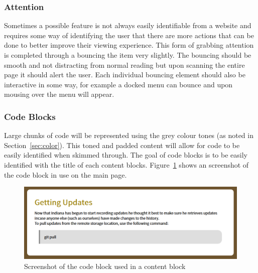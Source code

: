 \subsubsection{Attention}
Sometimes a possible feature is not always easily identifiable from a website and requires some way of identifying the user that there are more actions that can be done to better improve their viewing experience. This form of grabbing attention is completed through a bouncing the item very slightly. The bouncing should be smooth and not distracting from normal reading but upon scanning the entire page it should alert the user. Each individual bouncing element should also be interactive in some way, for example a docked menu can bounce and upon mousing over the menu will appear.

\subsubsection{Code Blocks}
Large chunks of code will be represented using the grey colour tones (as noted in Section~\ref{sec:color}). This toned and padded content will allow for code to be easily identified when skimmed through. The goal of code blocks is to be easily identified with the title of each content blocks. Figure~\ref{fig:codeblock} shows an screenshot of the code block in use on the main page.

\begin{figure}
	\centering
	\includegraphics[width=0.8\linewidth]{web1}
	\caption{Screenshot of the code block used in a content block}\label{fig:codeblock}
\end{figure}


